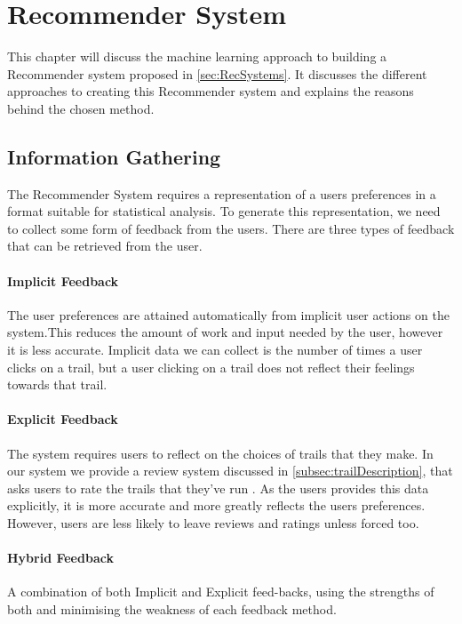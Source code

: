 \chapter{Recommender System} \label{chap:Recommender}

This chapter will discuss the machine learning approach to building a Recommender system proposed in \autoref{sec:RecSystems}. It discusses the different approaches to creating this Recommender system and explains the reasons behind the chosen method.

\section{Information Gathering}
The Recommender System requires a representation of a users preferences in a format suitable for statistical analysis. To generate this representation, we need to collect some form of feedback from the users. There are three types of feedback that can be retrieved from the user.

\subsubsection{Implicit Feedback}
The user preferences are attained automatically from \gls{implicit} user actions on the system.This reduces the amount of work and input needed by the user, however it is less accurate. Implicit data we can collect is the number of times a user clicks on a trail, but a user clicking on a trail does not reflect their feelings towards that trail.

\subsubsection{Explicit Feedback}
The system requires users to reflect on the choices of trails that they make. In our system we provide a review system discussed in \autoref{subsec:trailDescription}, that asks users to rate the trails that they've run \cite{jawaheer2010comparison}. As the users provides this data explicitly, it is more accurate and more greatly reflects the users preferences. However, users are less likely to leave reviews and ratings unless forced too.

\subsubsection{Hybrid Feedback}
A combination of both Implicit and Explicit feed-backs, using the strengths of both and minimising the weakness of each feedback method. 

